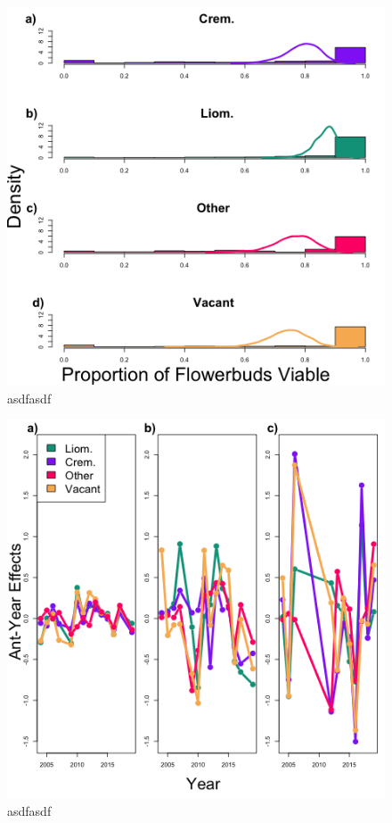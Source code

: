 \documentclass[12pt,a4paper]{article}
\begin{document}
\begin{figure}[h]
	\includegraphics[width=\linewidth]{Viability.png}
	\caption{asdfasdf}
	\label{fig:viability}
\end{figure}

\begin{figure}[h]
	\includegraphics[width=\linewidth]{year_ant_timeseries.png}
	\caption{asdfasdf}
	\label{fig:year-ant}
\end{figure}
\end{document}
